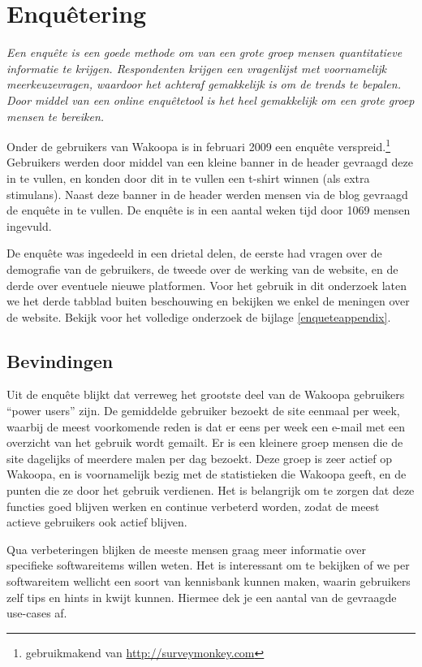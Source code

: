 \documentclass[a4paper, 10pt, pdftex]{report}
\begin{document}
    \section{Enqu\^etering}
    \textit{Een enqu\^ete is een goede methode om van een grote groep mensen quantitatieve informatie te krijgen. Respondenten krijgen een vragenlijst met voornamelijk meerkeuzevragen, waardoor het achteraf gemakkelijk is om de trends te bepalen. Door middel van een online enqu\^etetool is het heel gemakkelijk om een grote groep mensen te bereiken.}

    Onder de gebruikers van Wakoopa is in februari 2009 een enqu\^ete verspreid.\footnote{gebruikmakend van \url{http://surveymonkey.com}} Gebruikers werden door middel van een kleine banner in de header gevraagd deze in te vullen, en konden door dit in te vullen een t-shirt winnen (als extra stimulans). Naast deze banner in de header werden mensen via de blog gevraagd de enqu\^ete in te vullen. De enqu\^ete is in een aantal weken tijd door 1069 mensen ingevuld.

    De enqu\^ete was ingedeeld in een drietal delen, de eerste had vragen over de demografie van de gebruikers, de tweede over de werking van de website, en de derde over eventuele nieuwe platformen. Voor het gebruik in dit onderzoek laten we het derde tabblad buiten beschouwing en bekijken we enkel de meningen over de website. Bekijk voor het volledige onderzoek de bijlage \ref{enqueteappendix}.
  \subsection{Bevindingen}
    Uit de enqu\^ete blijkt dat verreweg het grootste deel van de Wakoopa gebruikers ``power users'' zijn. De gemiddelde gebruiker bezoekt de site eenmaal per week, waarbij de meest voorkomende reden is dat er eens per week een e-mail met een overzicht van het gebruik wordt gemailt. Er is een kleinere groep mensen die de site dagelijks of meerdere malen per dag bezoekt. Deze groep is zeer actief op Wakoopa, en is voornamelijk bezig met de statistieken die Wakoopa geeft, en de punten die ze door het gebruik verdienen. Het is belangrijk om te zorgen dat deze functies goed blijven werken en continue verbeterd worden, zodat de meest actieve gebruikers ook actief blijven.

    Qua verbeteringen blijken de meeste mensen graag meer informatie over specifieke softwareitems willen weten. Het is interessant om te bekijken of we per softwareitem wellicht een soort van kennisbank kunnen maken, waarin gebruikers zelf tips en hints in kwijt kunnen. Hiermee dek je een aantal van de gevraagde use-cases af.
\end{document}
